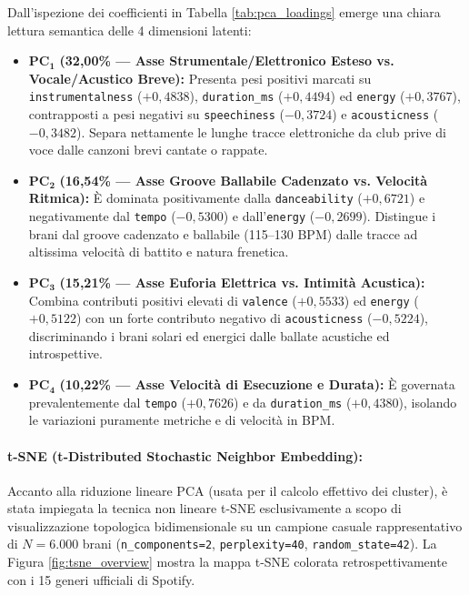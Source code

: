 Dall'ispezione dei coefficienti in Tabella \ref{tab:pca_loadings} emerge una chiara lettura semantica delle 4 dimensioni latenti:
\begin{itemize}
    \item $\mathbf{PC_1}$ \textbf{(32,00\% — Asse Strumentale/Elettronico Esteso vs. Vocale/Acustico Breve):} Presenta pesi positivi marcati su \texttt{instrumentalness} ($+0,4838$), \texttt{duration\_ms} ($+0,4494$) ed \texttt{energy} ($+0,3767$), contrapposti a pesi negativi su \texttt{speechiness} ($-0,3724$) e \texttt{acousticness} ($-0,3482$). Separa nettamente le lunghe tracce elettroniche da club prive di voce dalle canzoni brevi cantate o rappate.
    \item $\mathbf{PC_2}$ \textbf{(16,54\% — Asse Groove Ballabile Cadenzato vs. Velocità Ritmica):} È dominata positivamente dalla \texttt{danceability} ($+0,6721$) e negativamente dal \texttt{tempo} ($-0,5300$) e dall'\texttt{energy} ($-0,2699$). Distingue i brani dal groove cadenzato e ballabile (115--130 BPM) dalle tracce ad altissima velocità di battito e natura frenetica.
    \item $\mathbf{PC_3}$ \textbf{(15,21\% — Asse Euforia Elettrica vs. Intimità Acustica):} Combina contributi positivi elevati di \texttt{valence} ($+0,5533$) ed \texttt{energy} ($+0,5122$) con un forte contributo negativo di \texttt{acousticness} ($-0,5224$), discriminando i brani solari ed energici dalle ballate acustiche ed introspettive.
    \item $\mathbf{PC_4}$ \textbf{(10,22\% — Asse Velocità di Esecuzione e Durata):} È governata prevalentemente dal \texttt{tempo} ($+0,7626$) e da \texttt{duration\_ms} ($+0,4380$), isolando le variazioni puramente metriche e di velocità in BPM.
\end{itemize}

\newpage
\paragraph{t-SNE (t-Distributed Stochastic Neighbor Embedding):}
Accanto alla riduzione lineare PCA (usata per il calcolo effettivo dei cluster), è stata impiegata la tecnica non lineare t-SNE esclusivamente a scopo di visualizzazione topologica bidimensionale su un campione casuale rappresentativo di $N = 6.000$ brani (\texttt{n\_components=2}, \texttt{perplexity=40}, \texttt{random\_state=42}). La Figura \ref{fig:tsne_overview} mostra la mappa t-SNE colorata retrospettivamente con i 15 generi ufficiali di Spotify.

